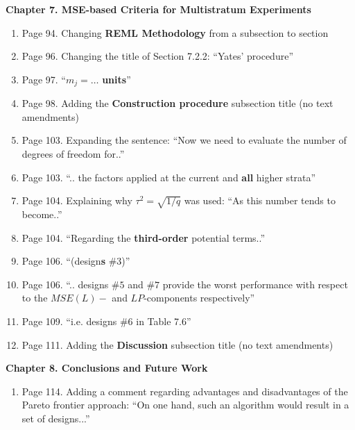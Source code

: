 \documentclass[11pt,a4paper,oneside]{article}
\begin{document}
\textbf{Chapter 7. MSE-based Criteria for Multistratum Experiments}
\begin{enumerate}
\item Page 94. Changing \textbf{REML Methodology} from a subsection to section
\item Page 96. Changing the title of Section 7.2.2: ``Yates' procedure'' 
\item Page 97. ``$m_j=\ldots$ \textbf{units}''
\item Page 98. Adding the \textbf{Construction procedure} subsection title (no text amendments)
\item Page 103. Expanding the sentence: ``Now we need to evaluate the number of degrees of freedom for..''
\item Page 103. ``.. the factors applied at the current and \textbf{all} higher strata''
\item Page 104. Explaining why $\tau^2=\sqrt{1/q}$ was used: ``As this number tends to become..''
\item Page 104. ``Regarding the \textbf{third-order} potential terms..''
\item Page 106. ``(design\textbf{s} \#$3$)''
\item Page 106. ``.. designs \#$5$ and \#$7$ provide the worst performance with respect to the $MSE(L)-$ and $LP$-components respectively''
\item Page 109. ``i.e. designs \#$6$ in Table 7.6''
\item Page 111. Adding the \textbf{Discussion} subsection title (no text amendments)
\end{enumerate}

\textbf{Chapter 8. Conclusions and Future Work}
\begin{enumerate}
\item Page 114. Adding a comment regarding advantages and disadvantages of the Pareto frontier approach: ``On one hand, such an algorithm would result in a set of designs...''
\end{enumerate}



\end{document}
